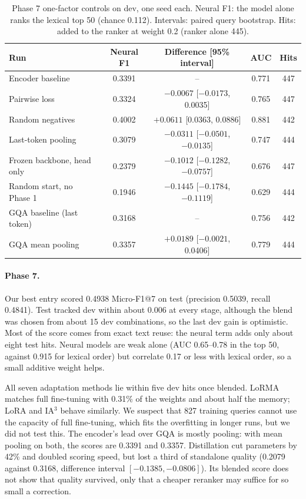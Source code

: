 \begin{table}[H]
\centering\small
\caption{Phase 7 one-factor controls on dev, one seed each. Neural F1: the model alone ranks the lexical top 50 (chance 0.112). Intervals: paired query bootstrap. Hits: added to the ranker at weight 0.2 (ranker alone 445).}
\label{tab:p7controls}
\begin{tabular}{lcccc}
\toprule
Run & Neural F1 & Difference [95\% interval] & AUC & Hits \\
\midrule
Encoder baseline & 0.3391 & -- & 0.771 & 447 \\
Pairwise loss & 0.3324 & $-0.0067$ [$-0.0173$, 0.0035] & 0.765 & 447 \\
Random negatives & 0.4002 & $+0.0611$ [0.0363, 0.0886] & 0.881 & 442 \\
Last-token pooling & 0.3079 & $-0.0311$ [$-0.0501$, $-0.0135$] & 0.747 & 444 \\
Frozen backbone, head only & 0.2379 & $-0.1012$ [$-0.1282$, $-0.0757$] & 0.676 & 447 \\
Random start, no Phase 1 & 0.1946 & $-0.1445$ [$-0.1784$, $-0.1119$] & 0.629 & 444 \\
\midrule
GQA baseline (last token) & 0.3168 & -- & 0.756 & 442 \\
GQA mean pooling & 0.3357 & $+0.0189$ [$-0.0021$, 0.0406] & 0.779 & 444 \\
\bottomrule
\end{tabular}
\end{table}

\paragraph{Phase 7.} Our best entry scored 0.4938 Micro-F1@7 on test (precision 0.5039, recall 0.4841). Test tracked dev within about 0.006 at every stage, although the blend was chosen from about 15 dev combinations, so the last dev gain is optimistic. Most of the score comes from exact text reuse: the neural term adds only about eight test hits. Neural models are weak alone (AUC 0.65--0.78 in the top 50, against 0.915 for lexical order) but correlate 0.17 or less with lexical order, so a small additive weight helps.

All seven adaptation methods lie within five dev hits once blended. LoRMA \cite{bihany2025lorma} matches full fine-tuning with 0.31\% of the weights and about half the memory; LoRA \cite{hu2022lora} and IA$^3$ \cite{liu2022ia3} behave similarly. We suspect that 827 training queries cannot use the capacity of full fine-tuning, which fits the overfitting in longer runs, but we did not test this. The encoder's lead over GQA is mostly pooling: with mean pooling on both, the scores are 0.3391 and 0.3357. Distillation \cite{hinton2015distilling} cut parameters by 42\% and doubled scoring speed, but lost a third of standalone quality (0.2079 against 0.3168, difference interval $[-0.1385, -0.0806]$). Its blended score does not show that quality survived, only that a cheaper reranker may suffice for so small a correction.

